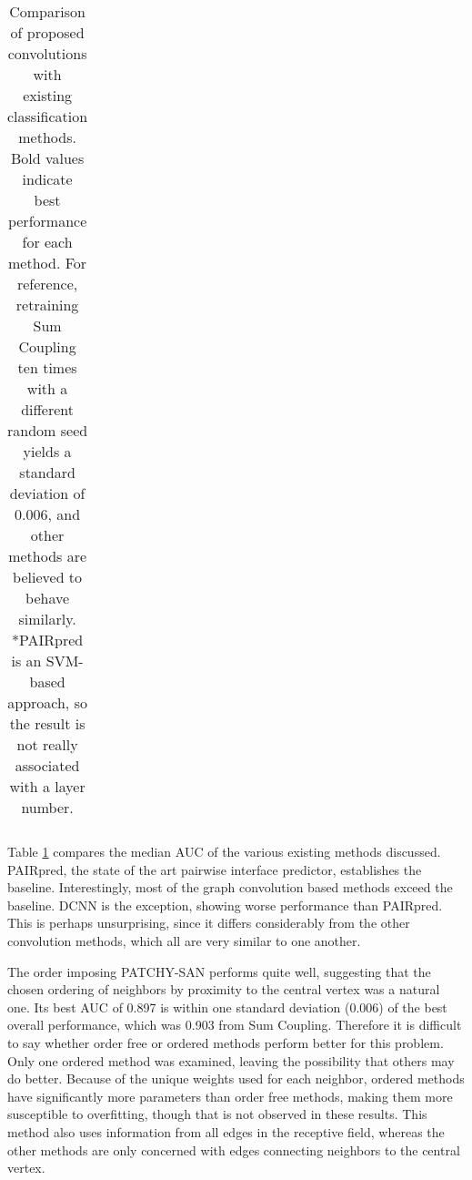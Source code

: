 \begin{table}
\begin{center}
\begin{tabular}{l c c c c c }
			\bottomrule
			
		\end{tabular}
		\caption{Comparison of proposed convolutions with existing classification methods. Bold values indicate best performance for each method. For reference, retraining Sum Coupling ten times with a different random seed yields a standard deviation of 0.006, and other methods are believed to behave similarly. *PAIRpred is an SVM-based approach, so the result is not really associated with a layer number.}
		\label{tab:results_compare}
	\end{center}
\end{table}

Table \ref{tab:results_compare} compares the median AUC of the various existing methods discussed.
PAIRpred, the state of the art pairwise interface predictor, establishes the baseline.
Interestingly, most of the graph convolution based methods exceed the baseline.
DCNN is the exception, showing worse performance than PAIRpred.
This is perhaps unsurprising, since it differs considerably from the other convolution methods, which all are very similar to one another.

The order imposing PATCHY-SAN performs quite well, suggesting that the chosen ordering of neighbors by proximity to the central vertex was a natural one.
Its best AUC of 0.897 is within one standard deviation (0.006) of the best overall performance, which was 0.903 from Sum Coupling.
Therefore it is difficult to say whether order free or ordered methods perform better for this problem.
Only one ordered method was examined, leaving the possibility that others may do better.
Because of the unique weights used for each neighbor, ordered methods have significantly more parameters than order free methods, making them more susceptible to overfitting, though that is not observed in these results.
This method also uses information from all edges in the receptive field, whereas the other methods are only concerned with edges connecting neighbors to the central vertex.

